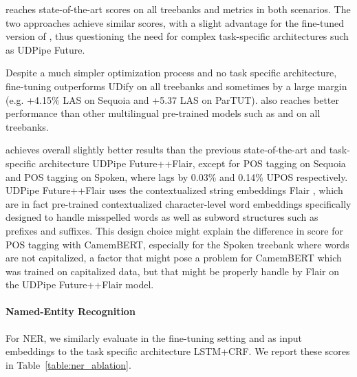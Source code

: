 \camembert reaches state-of-the-art scores on all treebanks and metrics in both scenarios. The two approaches achieve similar scores, with a slight advantage for the fine-tuned version of \camembert, thus questioning the need for complex task-specific architectures such as UDPipe Future.

Despite a much simpler optimization process and no task specific architecture, fine-tuning \camembert outperforms UDify on all treebanks and sometimes by a large margin (e.g. +4.15\% LAS on Sequoia and +5.37 LAS on ParTUT). \camembert also reaches better performance  than other multilingual pre-trained models such as \mbert and \xlmmlmtlm on all treebanks.

\camembert achieves overall slightly better results than the previous state-of-the-art and task-specific architecture UDPipe Future+\mbert+Flair, except for POS tagging on Sequoia and POS tagging on Spoken, where \camembert lags by 0.03\% and 0.14\% UPOS respectively.
UDPipe Future+\mbert+Flair uses the contextualized string embeddings Flair \citep{akbik-etal-2018-contextual}, which are in fact pre-trained contextualized character-level word embeddings specifically designed to handle misspelled words as well as subword structures such as prefixes and suffixes. This design choice might explain the difference in score for POS tagging with CamemBERT, especially for the Spoken treebank where words are not capitalized, a factor that might pose a problem for CamemBERT which was trained on capitalized data, but that might be properly handle by Flair on the UDPipe Future+\mbert+Flair model.

\paragraph{Named-Entity Recognition}
For NER, we similarly evaluate \camembert in the fine-tuning setting and as input embeddings to the task specific architecture LSTM+CRF. We report these scores in Table~\ref{table:ner_ablation}.

